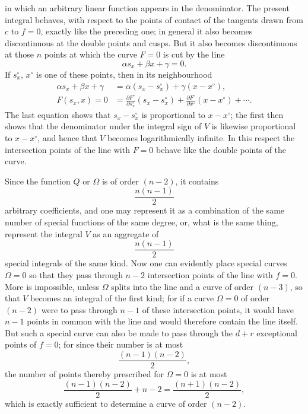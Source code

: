 \documentclass[10pt]{article}
\begin{document}

in which an arbitrary linear function appears in the denominator. The present integral behaves, with respect to the points of contact of the tangents drawn from $c$ to $f=0$, exactly like the preceding one; in general it also becomes discontinuous at the double points and cusps. But it also becomes discontinuous at those $n$ points at which the curve $F=0$ is cut by the line
\[
\alpha s_x+\beta x+\gamma=0.
\]
If $s_x^\circ$, $x^\circ$ is one of these points, then in its neighbourhood
\[
\begin{aligned}
\alpha s_x+\beta x+\gamma&=\alpha(s_x-s_x^\circ)+\gamma(x-x^\circ),\\
F(s_x,x)=0&=\frac{\partial F^\circ}{\partial s_x^\circ}(s_x-s_x^\circ)+\frac{\partial F^\circ}{\partial x^\circ}(x-x^\circ)+\cdots .
\end{aligned}
\]
The last equation shows that $s_x-s_x^\circ$ is proportional to $x-x^\circ$; the first then shows that the denominator under the integral sign of $V$ is likewise proportional to $x-x^\circ$, and hence that $V$ becomes logarithmically infinite. In this respect the intersection points of the line with $F=0$ behave like the double points of the curve.

Since the function $Q$ or $\Omega$ is of order $(n-2)$, it contains
\[
\frac{n(n-1)}{2}
\]
arbitrary coefficients, and one may represent it as a combination of the same number of special functions of the same degree, or, what is the same thing, represent the integral $V$ as an aggregate of
\[
\frac{n(n-1)}{2}
\]
special integrals of the same kind. Now one can evidently place special curves $\Omega=0$ so that they pass through $n-2$ intersection points of the line with $f=0$. More is impossible, unless $\Omega$ splits into the line and a curve of order $(n-3)$, so that $V$ becomes an integral of the first kind; for if a curve $\Omega=0$ of order $(n-2)$ were to pass through $n-1$ of these intersection points, it would have $n-1$ points in common with the line and would therefore contain the line itself. But such a special curve can also be made to pass through the $d+r$ exceptional points of $f=0$; for since their number is at most
\[
\frac{(n-1)(n-2)}{2},
\]
the number of points thereby prescribed for $\Omega=0$ is at most
\[
\frac{(n-1)(n-2)}{2}+n-2=\frac{(n+1)(n-2)}{2},
\]
which is exactly sufficient to determine a curve of order $(n-2)$.
\end{document}
